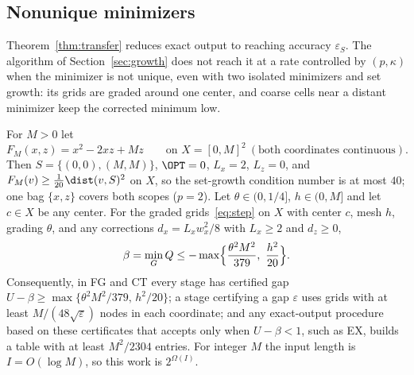 \subsection{Nonunique minimizers}\label{sec:exact-nonunique}

Theorem~\ref{thm:transfer} reduces exact output to reaching accuracy
$\varepsilon_S$. The algorithm of Section~\ref{sec:growth} does not reach it
at a rate controlled by $(p,\kappa)$ when the minimizer is not unique, even
with two isolated minimizers and set growth: its grids are graded around one
center, and coarse cells near a distant minimizer keep the corrected minimum
low.

\begin{proposition}
\label{prop:twocenters}
For $M>0$ let
\[
F_M(x,z)=x^2-2xz+Mz\qquad\text{on }X=[0,M]^2\ (\text{both coordinates
continuous}).
\]
Then $S=\{(0,0),(M,M)\}$, $\OPT=0$, $L_x=2$, $L_z=0$, and
$F_M(v)\ge\frac1{20}\dist(v,S)^2$ on $X$, so the set-growth condition number
is at most $40$; one bag $\{x,z\}$ covers both scopes ($p=2$).
Let $\theta\in(0,1/4]$, $h\in(0,M]$ and let $c\in X$ be any center. For the
graded grids~\eqref{eq:step} on $X$ with center $c$, mesh $h$, grading
$\theta$, and any corrections $d_x=L_xw_x^2/8$ with $L_x\ge2$ and $d_z\ge0$,
\begin{equation}\label{eq:twocenters}
\beta=\min_GQ\le-\max\Bigl\{\frac{\theta^2M^2}{379},\ \frac{h^2}{20}\Bigr\}.
\end{equation}
Consequently, in FG and CT every stage has certified gap
$U-\beta\ge\max\{\theta^2M^2/379,\,h^2/20\}$; a stage certifying a
gap $\varepsilon$ uses grids with at least $M/(48\sqrt\varepsilon)$ nodes in
each coordinate; and any exact-output procedure based on these certificates
that accepts only when $U-\beta<1$, such as EX, builds a table with at least
$M^2/2304$ entries. For integer $M$ the input length is $I=O(\log M)$, so
this work is $2^{\Omega(I)}$.
\end{proposition}

